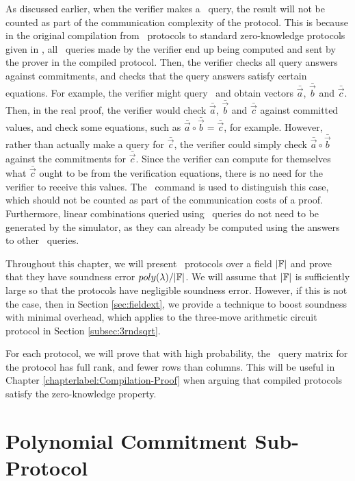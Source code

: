 As discussed earlier, when the verifier makes a \ILCcheck\ query, the result will not be counted as part of the communication complexity of the protocol. This is because in the original compilation from \ILC\ protocols to standard zero-knowledge protocols given in \cite{BootleCGGHJ17}, all \ILCopen\ queries made by the verifier end up being computed and sent by the prover in the compiled protocol. Then, the verifier checks all query answers against commitments, and checks that the query answers satisfy certain equations. For example, the verifier might query \ILC\ and obtain vectors $\bar{\vec{a}}$, $\bar{\vec{b}}$ and $\bar{\vec{c}}$. Then, in the real proof, the verifier would check $\bar{\vec{a}}$, $\bar{\vec{b}}$ and $\bar{\vec{c}}$ against committed values, and check some equations, such as $\bar{\vec{a}} \circ \bar{\vec{b}} = \bar{\vec{c}}$, for example. However, rather than actually make a query for $\bar{\vec{c}}$, the verifier could simply check $\bar{\vec{a}} \circ \bar{\vec{b}}$ against the commitments for $\bar{\vec{c}}$. Since the verifier can compute for themselves what $\bar{\vec{c}}$ ought to be from the verification equations, there is no need for the verifier to receive this values. The \ILCcheck\ command is used to distinguish this case, which should not be counted as part of the communication costs of a proof. Furthermore, linear combinations queried using \ILCcheck\ queries do not need to be generated by the simulator, as they can already be computed using the answers to other \ILCopen\ queries.

Throughout this chapter, we will present \ILC \ protocols over a field $|\mathbb{F}|$ and prove that they have soundness error $poly(\lambda) / |\mathbb{F}|$. We will assume that $|\mathbb{F}|$ is sufficiently large so that the protocols have negligible soundness error. However, if this is not the case, then in Section \ref{sec:fieldext}, we provide a technique to boost soundness with minimal overhead, which applies to the three-move arithmetic circuit protocol in Section \ref{subsec:3rndsqrt}.

For each protocol, we will prove that with high probability, the \ILC\ query matrix for the protocol has full rank, and fewer rows than columns. This will be useful in Chapter \ref{chapterlabel:Compilation-Proof} when arguing that compiled protocols satisfy the zero-knowledge property.

\section{Polynomial Commitment Sub-Protocol} \label{subsec:polycommit}

